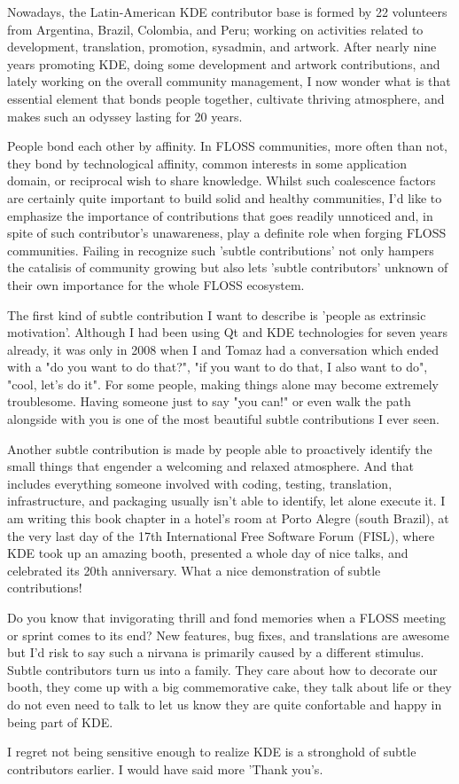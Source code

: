 Nowadays, the Latin-American KDE contributor base is formed by 22 volunteers from Argentina, Brazil, Colombia, and Peru; working on activities related to development, translation, promotion, sysadmin, and artwork. After nearly nine years promoting KDE, doing some development and artwork contributions, and lately working on the overall community management, I now wonder what is that essential element that bonds people together, cultivate thriving atmosphere, and makes such an odyssey lasting for 20 years.

People bond each other by affinity. In FLOSS communities, more often than not, they bond by technological affinity, common interests in some application domain, or reciprocal wish to share knowledge. Whilst such coalescence factors are certainly quite important to build solid and healthy communities, I'd like to emphasize the importance of contributions that goes readily unnoticed and, in spite of such contributor's unawareness, play a definite role when forging FLOSS communities. Failing in recognize such 'subtle contributions' not only hampers the catalisis of community growing but also lets 'subtle contributors' unknown of their own importance for the whole FLOSS ecosystem.

The first kind of subtle contribution I want to describe is 'people as extrinsic motivation'. Although I had been using Qt and KDE technologies for seven years already, it was only in 2008 when I and Tomaz had a conversation which ended with a "do you want to do that?", "if you want to do that, I also want to do", "cool, let's do it". For some people, making things alone may become extremely troublesome. Having someone just to say "you can!" or even walk the path alongside with you is one of the most beautiful subtle contributions I ever seen.

Another subtle contribution is made by people able to proactively identify the small things that engender a welcoming and relaxed atmosphere. And that includes everything someone involved with coding, testing, translation, infrastructure, and packaging usually isn't able to identify, let alone execute it. I am writing this book chapter in a hotel's room at Porto Alegre (south Brazil), at the very last day of the 17th International Free Software Forum (FISL), where KDE took up an amazing booth, presented a whole day of nice talks, and celebrated its 20th anniversary. What a nice demonstration of subtle contributions!

Do you know that invigorating thrill and fond memories when a FLOSS meeting or sprint comes to its end? New features, bug fixes, and translations are awesome but I'd risk to say such a nirvana is primarily caused by a different stimulus. Subtle contributors turn us into a family. They care about how to decorate our booth, they come up with a big commemorative cake, they talk about life or they do not even need to talk to let us know they are quite confortable and happy in being part of KDE.

I regret not being sensitive enough to realize KDE is a stronghold of subtle contributors earlier. I would have said more 'Thank you's.
